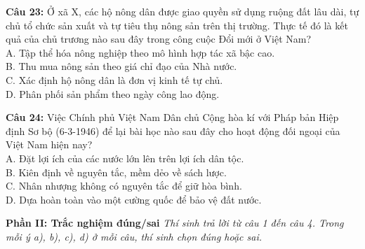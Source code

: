 \documentclass[12pt,a4paper]{article}
\begin{document}
\noindent \textbf{Câu 23:} Ở xã X, các hộ nông dân được giao quyền sử dụng ruộng đất lâu dài, tự chủ tổ chức sản xuất và tự tiêu thụ nông sản trên thị trường. Thực tế đó là kết quả của chủ trương nào sau đây trong công cuộc Đổi mới ở Việt Nam?\\
\noindent A. Tập thể hóa nông nghiệp theo mô hình hợp tác xã bậc cao.\\
\noindent B. Thu mua nông sản theo giá chỉ đạo của Nhà nước.\\
\noindent C. Xác định hộ nông dân là đơn vị kinh tế tự chủ.\\
\noindent D. Phân phối sản phẩm theo ngày công lao động.

\noindent \textbf{Câu 24:} Việc Chính phủ Việt Nam Dân chủ Cộng hòa kí với Pháp bản Hiệp định Sơ bộ (6-3-1946) để lại bài học nào sau đây cho hoạt động đối ngoại của Việt Nam hiện nay?\\
\noindent A. Đặt lợi ích của các nước lớn lên trên lợi ích dân tộc.\\
\noindent B. Kiên định về nguyên tắc, mềm dẻo về sách lược.\\
\noindent C. Nhân nhượng không có nguyên tắc để giữ hòa bình.\\
\noindent D. Dựa hoàn toàn vào một cường quốc để bảo vệ đất nước.

\vspace{0.5cm}
\textbf{Phần II: Trắc nghiệm đúng/sai} \textit{Thí sinh trả lời từ câu 1 đến câu 4. Trong mỗi ý a), b), c), d) ở mỗi câu, thí sinh chọn đúng hoặc sai.}
\end{document}
